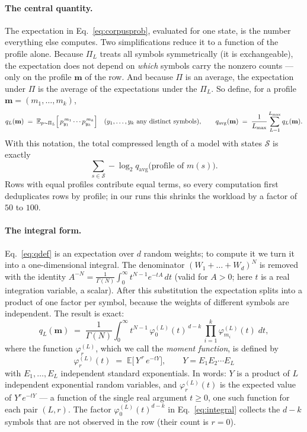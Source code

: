 \documentclass[11pt]{article}
\newcommand{\prof}{\mathbf{m}}
\newcommand{\field}[1]{\paragraph{#1.}}
\begin{document}
\field{The central quantity}
The expectation in Eq.~\eqref{eq:corpusprob}, evaluated for one
state, is the number everything else computes.  Two simplifications
reduce it to a function of the profile alone.  Because $\Pi_L$
treats all symbols symmetrically (it is exchangeable), the
expectation does not depend on \emph{which} symbols carry the
nonzero counts --- only on the profile $\prof$ of the row.  And
because $\Pi$ is an average, the expectation under $\Pi$ is the
average of the expectations under the $\Pi_L$.  So define, for a
profile $\prof = (m_1, \dots, m_k)$,
\begin{equation}
  q_L(\prof) \;=\; \mathbb{E}_{p \sim \Pi_L}
  \Bigl[\, p_{y_1}^{\,m_1} \cdots p_{y_k}^{\,m_k} \Bigr]
  \quad (y_1, \dots, y_k \text{ any distinct symbols}),
  \qquad
  q_{\mathrm{avg}}(\prof) \;=\; \frac{1}{L_{\max}}
  \sum_{L=1}^{L_{\max}} q_L(\prof).
  \label{eq:qdef}
\end{equation}
With this notation, the total compressed length of a model with
states $\mathcal{S}$ is exactly
\[
  \sum_{s \in \mathcal{S}} -\log_2
  q_{\mathrm{avg}}\bigl(\text{profile of } m(s)\bigr).
\]
Rows with equal profiles contribute equal terms, so every
computation first deduplicates rows by profile; in our runs this
shrinks the workload by a factor of $50$ to $100$.

\field{The integral form}
Eq.~\eqref{eq:qdef} is an expectation over $d$ random weights; to
compute it we turn it into a one-dimensional integral.  The
denominator $(W_1 + \dots + W_d)^N$ is removed with the identity
$A^{-N} = \frac{1}{\Gamma(N)} \int_0^\infty t^{N-1} e^{-tA}\, dt$
(valid for $A > 0$; here $t$ is a real integration variable, a
scalar).  After this substitution the expectation splits into a
product of one factor per symbol, because the weights of different
symbols are independent.  The result is exact:
\begin{equation}
  q_L(\prof) \;=\; \frac{1}{\Gamma(N)} \int_0^{\infty} t^{N-1}\,
  \varphi^{(L)}_0(t)^{\,d-k}\,
  \prod_{i=1}^{k} \varphi^{(L)}_{m_i}(t)\; dt,
  \label{eq:integral}
\end{equation}
where the function $\varphi^{(L)}_r$, which we call the
\emph{moment function}, is defined by
\begin{equation}
  \varphi^{(L)}_{r}(t) \;=\; \mathbb{E}\bigl[\,Y^{\,r}\, e^{-tY}
  \bigr],
  \qquad Y = E_1 E_2 \cdots E_L
  \label{eq:phidef}
\end{equation}
with $E_1, \dots, E_L$ independent standard exponentials.  In words:
$Y$ is a product of $L$ independent exponential random variables, and
$\varphi^{(L)}_r(t)$ is the expected value of $Y^r e^{-tY}$ --- a
function of the single real argument $t \ge 0$, one such function for
each pair $(L, r)$.  The factor $\varphi^{(L)}_0(t)^{d-k}$ in
Eq.~\eqref{eq:integral} collects the $d - k$ symbols that are not
observed in the row (their count is $r = 0$).
\end{document}
